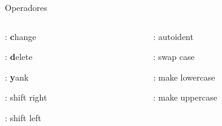\begin{frame}{Operadores}
    \begin{columns}
        \begin{column}{0.5\textwidth}
            \begin{widedescription}
                \item {}: \textbf{c}hange
                \item {}: \textbf{d}elete
                \item {}: \textbf{y}ank
                \item \key{\textgreater}: shift right
                \item \key{\textless}: shift left
            \end{widedescription}
        \end{column}
        
        \begin{column}{0.5\textwidth}
            \begin{widedescription}
                \item \key{=}: autoident
                \item {}: swap case
                \item {}: make lowercase
                \item {}: make uppercase
            \end{widedescription}
        \end{column}
    \end{columns}
\end{frame}

%        

